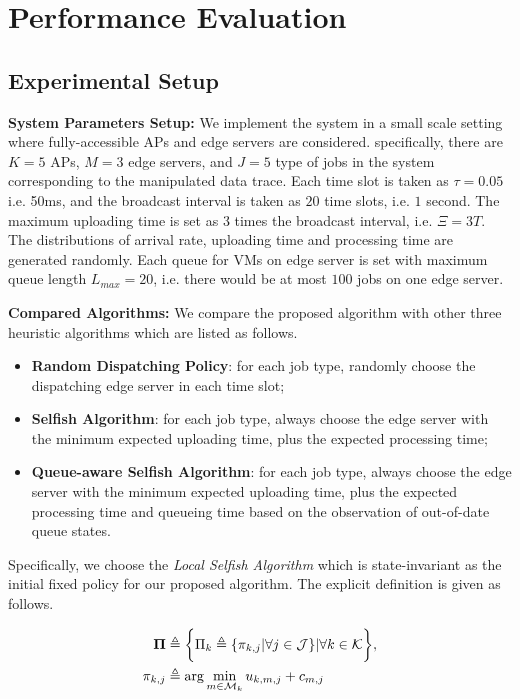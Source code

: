 \section{Performance Evaluation}
\label{sec:evaluation}

\subsection{Experimental Setup}
\textbf{System Parameters Setup:}
We implement the system in a small scale setting where fully-accessible APs and edge servers are considered.
specifically, there are $K=5$ APs, $M=3$ edge servers, and $J=5$ type of jobs in the system corresponding to the manipulated data trace.
Each time slot is taken as $\tau = 0.05$ i.e. 50ms, and the broadcast interval is taken as $20$ time slots, i.e. $1$ second.
The maximum uploading time is set as $3$ times the broadcast interval, i.e. $\Xi = 3T$.
The distributions of arrival rate, uploading time and processing time are generated randomly.
Each queue for VMs on edge server is set with maximum queue length $L_{max}=20$, i.e. there would be at most $100$ jobs on one edge server.

\textbf{Compared Algorithms:}
We compare the proposed algorithm with other three heuristic algorithms which are listed as follows.
\begin{itemize}
    \item \textbf{Random Dispatching Policy}:
            for each job type, randomly choose the dispatching edge server in each time slot; 
    \item \textbf{Selfish Algorithm}:
            for each job type, always choose the edge server with the minimum expected uploading time, plus the expected processing time;
    \item \textbf{Queue-aware Selfish Algorithm}:
            for each job type, always choose the edge server with the minimum expected uploading time, plus the expected processing time and queueing time based on the observation of out-of-date queue states.
\end{itemize}
Specifically, we choose the \emph{Local Selfish Algorithm} which is state-invariant as the initial fixed policy for our proposed algorithm.
The explicit definition is given as follows.
\begin{policy}
    \begin{align}
        \boldsymbol{\Pi} &\triangleq \bigg\{ \Pi_{k}\triangleq\{\pi_{k,j}|\forall j\in\mathcal{J}\} |\forall k\in\mathcal{K} \bigg\},
        \\
        \pi_{k,j} &\triangleq \arg\min_{m\in\mathcal{M}_{k}} u_{k,m,j} + c_{m,j}
    \end{align} 
\end{policy}


